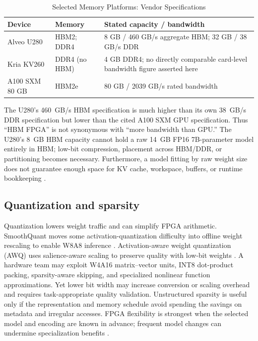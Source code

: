 \documentclass[conference,10pt]{IEEEtran}
\begin{document}
\begin{table}[t]
\caption{Selected Memory Platforms: Vendor Specifications}
\label{tab:memory}
\centering
\footnotesize
\begin{tabular}{@{}p{1.1cm}p{2.05cm}p{3.75cm}@{}}
\toprule
Device & Memory & Stated capacity / bandwidth \\
\midrule
Alveo U280 \cite{amdU280} & HBM2; DDR4 & 8 GB / 460 GB/s aggregate HBM; 32 GB / 38 GB/s DDR \\
Kria KV260 \cite{amdKV260} & DDR4 (no HBM) & 4 GB DDR4; no directly comparable card-level bandwidth figure asserted here \\
A100 SXM 80 GB \cite{nvidiaA100} & HBM2e & 80 GB / 2039 GB/s rated bandwidth \\
\bottomrule
\end{tabular}
\end{table}

The U280's 460~GB/s HBM specification is much higher than its own 38~GB/s DDR specification but lower than the cited A100 SXM GPU specification. Thus ``HBM FPGA'' is not synonymous with ``more bandwidth than GPU.'' The U280's 8~GB HBM capacity cannot hold a raw 14~GB FP16 7B-parameter model entirely in HBM; low-bit compression, placement across HBM/DDR, or partitioning becomes necessary. Furthermore, a model fitting by raw weight size does not guarantee enough space for KV cache, workspace, buffers, or runtime bookkeeping \cite{amdU280,nvidiaA100}.

\subsection{Quantization and sparsity}
Quantization lowers weight traffic and can simplify FPGA arithmetic. SmoothQuant moves some activation-quantization difficulty into offline weight rescaling to enable W8A8 inference \cite{xiao2023}. Activation-aware weight quantization (AWQ) uses salience-aware scaling to preserve quality with low-bit weights \cite{lin2024}. A hardware team may exploit W4A16 matrix--vector units, INT8 dot-product packing, sparsity-aware skipping, and specialized nonlinear function approximations. Yet lower bit width may increase conversion or scaling overhead and requires task-appropriate quality validation. Unstructured sparsity is useful only if the representation and memory schedule avoid spending the savings on metadata and irregular accesses. FPGA flexibility is strongest when the selected model and encoding are known in advance; frequent model changes can undermine specialization benefits \cite{zeng2024,huang2025,blankestijn2026}.
\end{document}
